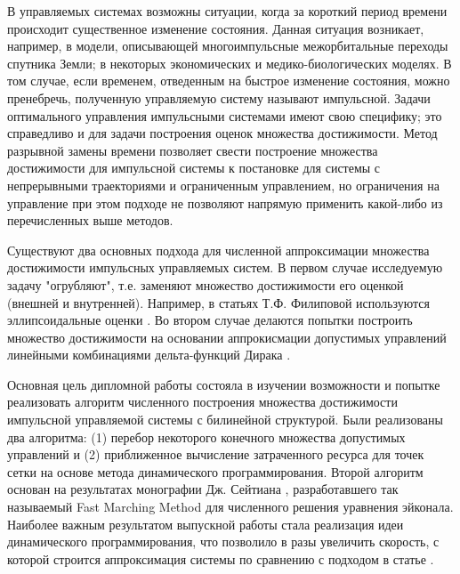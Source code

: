 В управляемых системах возможны ситуации, когда за короткий период
времени происходит существенное изменение состояния. Данная ситуация
возникает, например, в модели, описывающей многоимпульсные
межорбитальные переходы спутника Земли; в некоторых экономических и
медико-биологических моделях. В том случае, если временем, отведенным
на быстрое изменение состояния, можно пренебречь, полученную
управляемую систему называют импульсной. Задачи оптимального
управления импульсными системами имеют свою специфику; это справедливо
и для задачи построения оценок множества достижимости.  Метод
разрывной замены времени позволяет свести построение множества
достижимости для импульсной системы к постановке для системы с
непрерывными траекториями и ограниченным управлением, но ограничения
на управление при этом подходе не позволяют напрямую применить
какой-либо из перечисленных выше методов.

Существуют два основных подхода для численной аппроксимации множества
достижимости импульсных управляемых систем. В первом случае
исследуемую задачу "огрубляют", т.е. заменяют множество достижимости
его оценкой (внешней и внутренней). Например, в статьях Т.Ф. Филиповой
используются эллипсоидальные оценки \cite{FM2011}. Во втором случае
делаются попытки построить множество достижимости на основании
аппрокисмации допустимых управлений линейными комбинациями
дельта-функций Дирака \cite{BS2005}.

Основная цель дипломной работы состояла в изучении возможности и
попытке реализовать алгоритм численного построения множества
достижимости импульсной управляемой системы с билинейной
структурой. Были реализованы два алгоритма: (1) перебор некоторого
конечного множества допустимых управлений и (2) приближенное
вычисление затраченного ресурса для точек сетки на основе метода
динамического программирования. Второй алгоритм основан на результатах
монографии Дж. Сейтиана \cite{S1999}, разработавшего так называемый
Fast Marching Method для численного решения уравнения эйконала.
Наиболее важным результатом выпускной работы стала реализация идеи
динамического программирования, что позволило в разы увеличить
скорость, с которой строится аппроксимация системы по сравнению с
подходом в статье \cite{BS2005}.

